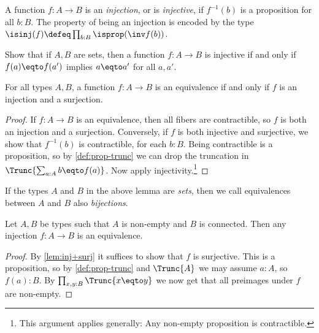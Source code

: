 \begin{definition}\label{def:injection}
  A function $f:A\to B$ is an \emph{injection}, or is \emph{injective},
  if $f^{-1}(b)$ is a proposition for all $b:B$.  The property of being an injection is encoded by
  the type $\isinj(f) \defeq \prod_{b:B} \isprop(\inv f (b))$.
\end{definition}

\begin{xca}\label{xca:inj-sets}
  Show that if $A,B$ are sets, then a function
  $f : A \to B$ is injective if and only if
  $f(a) \eqto f(a')$ implies $a \eqto a'$ for all $a,a'$.
\end{xca}

\begin{lemma}\label{lem:inj+surj}
For all types $A,B$, a function $f: A\to B$ is an equivalence
if and only if $f$ is an injection and a surjection.
\end{lemma}

\begin{proof}
If $f: A\to B$ is an equivalence, then all fibers are contractible,
so $f$ is both an injection and a surjection. Conversely,
if $f$ is both injective and surjective, we show that
$f^{-1}(b)$ is contractible, for each $b:B$.
Being contractible is a proposition, so by \cref{def:prop-trunc}
we can drop the truncation in $\Trunc{\sum_{a:A} b \eqto f(a)}$.
Now apply injectivity.\footnote{%
  This argument applies generally:
  Any non-empty proposition is contractible.}
\end{proof}

If the types $A$ and $B$ in the above lemma are \emph{sets},
then we call equivalences between $A$ and $B$ also \emph{bijections}.

\begin{corollary}\label{cor:inj+connected}
Let $A,B$ be types such that $A$ is non-empty and $B$ is connected.
Then any injection $f: A\to B$ is an equivalence.
\end{corollary}
\begin{proof}
By \cref{lem:inj+surj} it suffices to show that $f$ is surjective.
This is a proposition, so by \cref{def:prop-trunc} and $\Trunc{A}$
we may assume $a:A$, so $f(a):B$. By $\prod_{x,y:B} \Trunc{x \eqto y}$
we now get that all preimages under $f$ are non-empty.
\end{proof}

